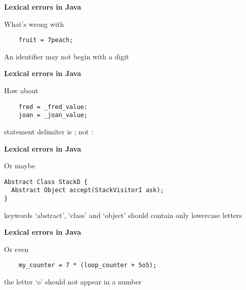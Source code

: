 %
%
\begin{slide}{}
{\bf Lexical errors in Java}

What's wrong with

\begin{verbatim}
    fruit = 7peach;
\end{verbatim}

An identifier may not begin with a digit

\end{slide}
%
%
\begin{slide}{}
{\bf Lexical errors in Java}

How about

\begin{verbatim}
    fred = _fred_value:
    joan = _joan_value;
\end{verbatim}

statement delimiter is ; not :
\end{slide}
%
%
\begin{slide}{}
{\bf Lexical errors in Java}

Or maybe

\begin{verbatim}
Abstract Class StackD {
  Abstract Object accept(StackVisitorI ask);
}
\end{verbatim}

keywords `abstract', `class' and `object' should contain only lowercase letters
\end{slide}
%
%
\begin{slide}{}
{\bf Lexical errors in Java}

Or even

\begin{verbatim}
    my_counter = 7 * (loop_counter + 5o5);
\end{verbatim}

the letter `o' should not appear in a number
\end{slide}
%
%
